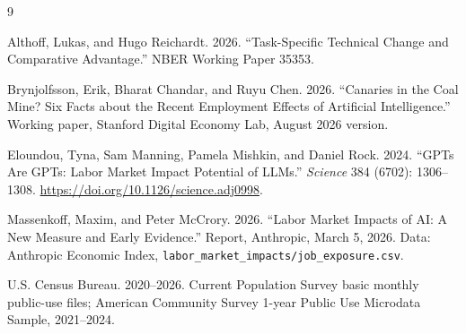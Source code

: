 \documentclass[11pt]{article}
\begin{document}
\begin{thebibliography}{9}

Althoff, Lukas, and Hugo Reichardt. 2026.
``Task-Specific Technical Change and Comparative Advantage.''
NBER Working Paper 35353.

Brynjolfsson, Erik, Bharat Chandar, and Ruyu Chen. 2026.
``Canaries in the Coal Mine? Six Facts about the Recent Employment Effects of Artificial Intelligence.''
Working paper, Stanford Digital Economy Lab, August 2026 version.

Eloundou, Tyna, Sam Manning, Pamela Mishkin, and Daniel Rock. 2024.
``GPTs Are GPTs: Labor Market Impact Potential of LLMs.''
\textit{Science} 384 (6702): 1306--1308. \url{https://doi.org/10.1126/science.adj0998}.

Massenkoff, Maxim, and Peter McCrory. 2026.
``Labor Market Impacts of AI: A New Measure and Early Evidence.''
Report, Anthropic, March 5, 2026. Data: Anthropic Economic Index, \texttt{labor\_market\_impacts/job\_exposure.csv}.

U.S. Census Bureau. 2020--2026. Current Population Survey basic monthly public-use files; American Community Survey 1-year Public Use Microdata Sample, 2021--2024.

\end{thebibliography}
\end{document}
